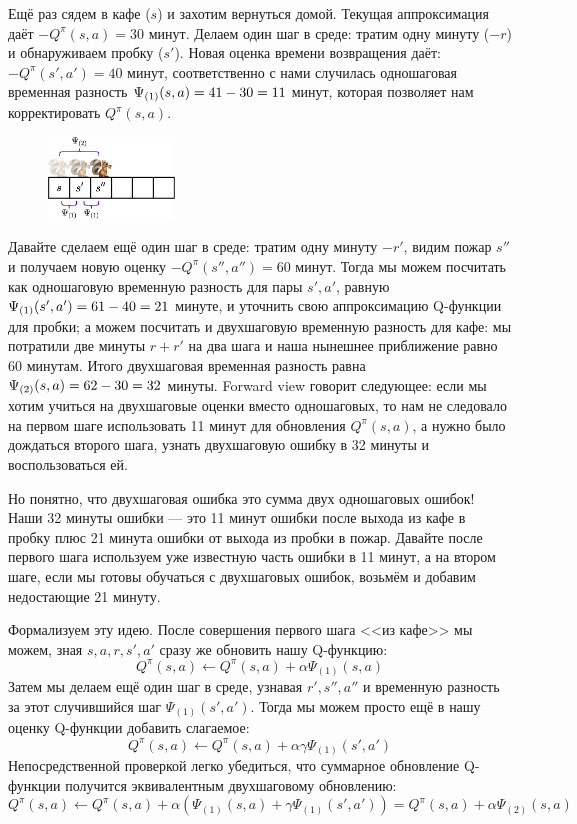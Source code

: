 \begin{example}
Ещё раз сядем в кафе ($s$) и захотим вернуться домой. Текущая аппроксимация даёт $-Q^\pi(s, a) = 30$ минут. Делаем один шаг в среде: тратим одну минуту ($-r$) и обнаруживаем пробку ($s'$). Новая оценка времени возвращения даёт: $-Q^\pi(s', a') = 40$ минут, соответственно с нами случилась одношаговая временная разность $\Psi_{(1)}(s, a) = 41 - 30 \HM= 11$ минут, которая позволяет нам корректировать $Q^\pi(s, a)$.

\begin{figure}
\vspace{-0.3cm}
\centering
\includegraphics[width=0.3\textwidth]{Images/MultiStepErrors3.png}
\vspace{-0.3cm}
\end{figure}

Давайте сделаем ещё один шаг в среде: тратим одну минуту $-r'$, видим пожар $s''$ и получаем новую оценку $-Q^\pi(s'', a'') = 60$ минут. Тогда мы можем посчитать как одношаговую временную разность для пары $s', a'$, равную $\Psi_{(1)}(s', a') \HM= 61 \HM- 40 \HM= 21$ минуте, и уточнить свою аппроксимацию Q-функции для пробки; а можем посчитать и двухшаговую временную разность для кафе: мы потратили две минуты $r + r'$ на два шага и наша нынешнее приближение равно 60 минутам. Итого двухшаговая временная разность равна $\Psi_{(2)}(s, a) \HM= 62 - 30 = 32$ минуты. Forward view говорит следующее: если мы хотим учиться на двухшаговые оценки вместо одношаговых, то нам не следовало на первом шаге использовать 11 минут для обновления $Q^\pi(s, a)$, а нужно было дождаться второго шага, узнать двухшаговую ошибку в 32 минуты и воспользоваться ей.

Но понятно, что двухшаговая ошибка это сумма двух одношаговых ошибок! Наши 32 минуты ошибки --- это 11 минут ошибки после выхода из кафе в пробку плюс 21 минута ошибки от выхода из пробки в пожар. Давайте после первого шага используем уже известную часть ошибки в 11 минут, а на втором шаге, если мы готовы обучаться с двухшаговых ошибок, возьмём и добавим недостающие 21 минуту.
\end{example}

Формализуем эту идею. После совершения первого шага <<из кафе>> мы можем, зная $s, a, r, s', a'$ сразу же обновить нашу Q-функцию:
$$
Q^{\pi}(s, a) \leftarrow Q^{\pi}(s, a) + \alpha \Psi_{(1)}(s, a)
$$
Затем мы делаем ещё один шаг в среде, узнавая $r', s'', a''$ и временную разность за этот случившийся шаг $\Psi_{(1)}(s', a')$. Тогда мы можем просто ещё в нашу оценку Q-функции добавить слагаемое:
$$
Q^{\pi}(s, a) \leftarrow Q^{\pi}(s, a) + \alpha \gamma \Psi_{(1)}(s', a')
$$
Непосредственной проверкой легко убедиться, что суммарное обновление Q-функции получится эквивалентным двухшаговому обновлению:
$$
Q^{\pi}(s, a) \leftarrow Q^{\pi}(s, a) + \alpha (\Psi_{(1)}(s, a) + \gamma \Psi_{(1)}(s', a')) = Q^{\pi}(s, a) + \alpha \Psi_{(2)}(s, a)
$$

